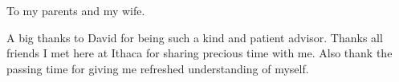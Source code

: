 \documentclass[phd,tocprelim]{cornell}
\begin{document}
\begin{dedication}
To my parents and my wife.
\end{dedication}

\begin{acknowledgements}
A big thanks to David for being such a kind and patient advisor. Thanks all friends I met here at Ithaca for sharing precious time with me. Also thank the passing time for giving me refreshed understanding of myself.
\end{acknowledgements}

\contentspage
\tablelistpage
\figurelistpage

\normalspacing \setcounter{page}{1} 
\pagestyle{cornell} \addtolength{\parskip}{0.5\baselineskip}



%
%
%


\end{document}
